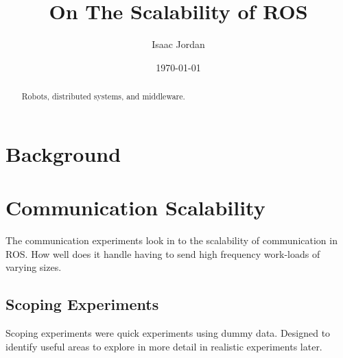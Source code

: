 \documentclass{l4proj}
\begin{document}
\title{On The Scalability of ROS}
\author{Isaac Jordan}
\date{\today}
\maketitle

\begin{abstract}
Robots, distributed systems, and middleware.
\end{abstract}

\educationalconsent
%
%
\tableofcontents

\pagebreak
{}



\chapter{Background}









\chapter{Communication Scalability}

The communication experiments look in to the scalability of communication in ROS. How well does it handle having to send high frequency work-loads of varying sizes.

\section{Scoping Experiments}

Scoping experiments were quick experiments using dummy data. Designed to identify useful areas to explore in more detail in realistic experiments later.
\end{document}
